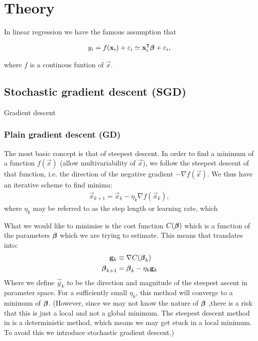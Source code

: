 \section{Theory}\label{sec:theory}

In linear regression we have the famous assumption that 

\begin{align}
    y_i = f(\mathbf{x}_i) + \varepsilon_i \simeq \mathbf{x}_i^\intercal \boldsymbol{\beta} + \varepsilon_i,
\end{align}

where $f$ is a continous funtion of $\vec{x}$.  


\subsection{Stochastic gradient descent (SGD)}\label{sec:stochastic_gradient_descent}
    Gradient descent \citep{mhjensen} 

    \subsubsection{Plain gradient descent (GD)}\label{sec:plain_gradient_descent}
        The most basic concept is that of steepest descent. In order to find a minimum of a function $f(\vec{x})$ (allow multivariability of $\vec{x}$), we follow the steepest descent of that function, i.e. the direction of the negative gradient $-\nabla f(\vec{x})$. We thus have an iterative scheme to find minima:
        \begin{align}\label{eq:steepest_descent}
            \vec{x}_{k+1} = \vec{x}_k - \eta_k\nabla f(\vec{x}_k),
        \end{align}
        where $\eta_k$ may be referred to as the step length or learning rate, which \fillertext

        What we would like to minimise is the cost function $C(\boldsymbol{\beta})$ which is a function of the parameters $\boldsymbol{\beta}$ which we are trying to estimate. This means that  translates into:
        \begin{align}\label{eq:steepest_descent_cost_function}
            \mathbf{g}_k &\equiv \nabla C(\boldsymbol{\beta}_k) \nonumber \\
            \boldsymbol{\beta}_{k+1} &= \boldsymbol{\beta}_k - \eta_k\mathbf{g}_k
        \end{align}
        Where we define $\vec{g}_k$ to be the direction and magnitude of the steepest ascent in parameter space. 
        For a sufficiently small $\eta_k$, this method will converge to a minimum of $\boldsymbol{\beta}$. (However, since we may not know the nature of $\boldsymbol{\beta}$ ,there is a risk that this is just a local and not a global minimum. The steepest descent method in  is a deterministic method, which means we may get stuck in a local minimum. To avoid this we introduce stochastic gradient descent.) 

